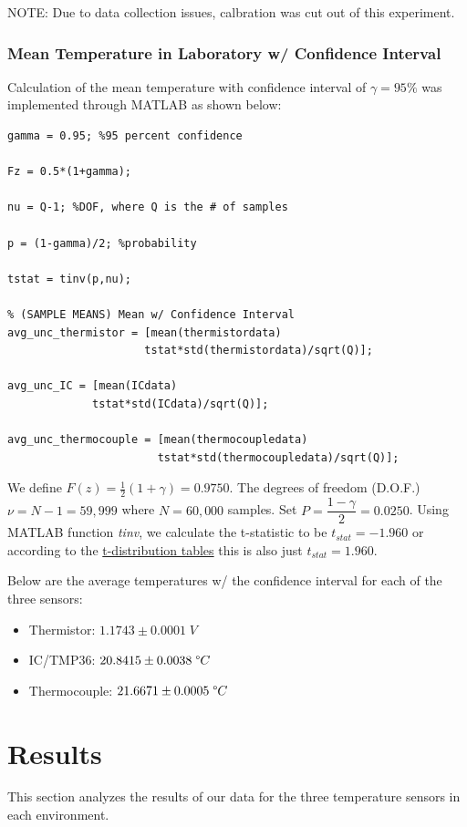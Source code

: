 \documentclass{article}
\begin{document}
NOTE: Due to data collection issues, calbration was cut out of this experiment.

\subsubsection*{Mean Temperature in Laboratory w/ Confidence Interval}
Calculation of the mean temperature with confidence interval of $\gamma = 95\%$ was implemented through MATLAB as shown below:
\begin{lstlisting}[style=Matlab-editor]
% Confidence Interval in Laboratory
gamma = 0.95; %95 percent confidence

Fz = 0.5*(1+gamma);

nu = Q-1; %DOF, where Q is the # of samples

p = (1-gamma)/2; %probability

tstat = tinv(p,nu); 

% (SAMPLE MEANS) Mean w/ Confidence Interval
avg_unc_thermistor = [mean(thermistordata) 
                     tstat*std(thermistordata)/sqrt(Q)];

avg_unc_IC = [mean(ICdata) 
             tstat*std(ICdata)/sqrt(Q)];

avg_unc_thermocouple = [mean(thermocoupledata)  
                       tstat*std(thermocoupledata)/sqrt(Q)];
\end{lstlisting}

We define $F(z) = \frac{1}{2}(1+\gamma) = 0.9750$. The degrees of freedom (D.O.F.) $\nu = N - 1 = 59,999$ where $N=60,000$ samples. Set $P=\dfrac{1-\gamma}{2}=0.0250$. Using MATLAB function \textit{tinv}, we calculate the t-statistic to be $t_{stat} = -1.960$ or according to the \hyperlink{1}{t-distribution tables} this is also just $t_{stat}=1.960$.

Below are the average temperatures w/ the confidence interval for each of the three sensors:
\begin{itemize}
    \item Thermistor: \(1.1743 \pm 0.0001\; V \)
    \item IC/TMP36: \(20.8415 \pm 0.0038\; \degree C\)
    \item Thermocouple: \(21.6671 \pm 0.0005\; \degree C\)
\end{itemize}


\section{Results}
This section analyzes the results of our data for the three temperature sensors in each environment.
\end{document}
